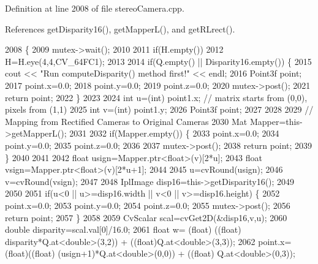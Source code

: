 Definition at line 2008 of file stereo\+Camera.\+cpp.



References get\+Disparity16(), get\+Mapper\+L(), and get\+R\+Lrect().


\begin{DoxyCode}
2008                                                                                   \{
2009     mutex->wait();
2010 
2011     \textcolor{keywordflow}{if}(H.empty())
2012         H=H.eye(4,4,CV\_64FC1);
2013 
2014     \textcolor{keywordflow}{if}(Q.empty() || Disparity16.empty()) \{
2015         cout << \textcolor{stringliteral}{"Run computeDisparity() method first!"} << endl;
2016         Point3f point;
2017         point.x=0.0;
2018         point.y=0.0;
2019         point.z=0.0;
2020         mutex->post();
2021         \textcolor{keywordflow}{return} point;
2022     \}
2023 
2024     \textcolor{keywordtype}{int} u=(int) point1.x; \textcolor{comment}{// matrix starts from (0,0), pixels from (1,1)}
2025     \textcolor{keywordtype}{int} v=(\textcolor{keywordtype}{int}) point1.y;
2026     Point3f point;
2027 
2028 
2029     \textcolor{comment}{// Mapping from Rectified Cameras to Original Cameras}
2030     Mat Mapper=this->getMapperL();
2031 
2032     \textcolor{keywordflow}{if}(Mapper.empty()) \{
2033         point.x=0.0;
2034         point.y=0.0;
2035         point.z=0.0;
2036 
2037         mutex->post();
2038         \textcolor{keywordflow}{return} point;
2039     \}
2040 
2041 
2042     \textcolor{keywordtype}{float} usign=Mapper.ptr<\textcolor{keywordtype}{float}>(v)[2*u];
2043     \textcolor{keywordtype}{float} vsign=Mapper.ptr<\textcolor{keywordtype}{float}>(v)[2*u+1];
2044 
2045     u=cvRound(usign);
2046     v=cvRound(vsign);
2047 
2048     IplImage disp16=this->getDisparity16();
2049 
2050 
2051     \textcolor{keywordflow}{if}(u<0 || u>=disp16.width || v<0 || v>=disp16.height) \{
2052         point.x=0.0;
2053         point.y=0.0;
2054         point.z=0.0;
2055         mutex->post();
2056         \textcolor{keywordflow}{return} point;
2057     \}
2058 
2059     CvScalar scal=cvGet2D(&disp16,v,u);
2060     \textcolor{keywordtype}{double} disparity=scal.val[0]/16.0;
2061     \textcolor{keywordtype}{float} w= (float) ((\textcolor{keywordtype}{float}) disparity*Q.at<\textcolor{keywordtype}{double}>(3,2)) + ((float)Q.at<\textcolor{keywordtype}{double}>(3,3));
2062     point.x= (float)((\textcolor{keywordtype}{float}) (usign+1)*Q.at<\textcolor{keywordtype}{double}>(0,0)) + ((\textcolor{keywordtype}{float}) Q.at<\textcolor{keywordtype}{double}>(0,3));

\end{DoxyCode}

